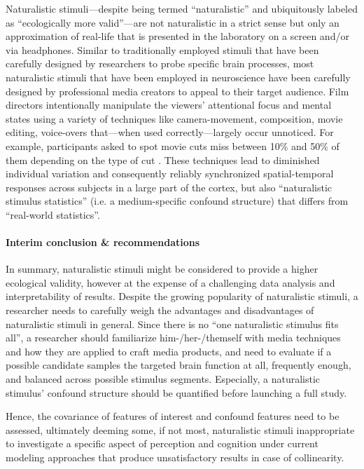 %
Naturalistic stimuli---despite being termed ``naturalistic'' and ubiquitously
labeled as ``ecologically more valid''---are not naturalistic in a strict sense
but only an approximation of real-life that is presented in the laboratory on a
screen and/or via headphones.
Similar to traditionally employed stimuli that have been carefully designed by
researchers to probe specific brain processes, most naturalistic stimuli that
have been employed in neuroscience have been carefully designed by professional
media creators to appeal to their target audience.
%
Film directors intentionally manipulate the viewers' attentional focus and
mental states using a variety of techniques like camera-movement, composition,
movie editing, voice-overs \citep{brown2012cinematography,
dancyger2011film-technique, katz1991film, mercado2011filmmakers} that---when
used correctly---largely occur unnoticed.
%
For example, participants asked to spot movie cuts miss between 10\% and 50\% of
them depending on the type of cut \citep{smith2008edit}.
%
These techniques lead to diminished individual variation and consequently
reliably synchronized spatial-temporal responses across subjects
\citep{hasson2008neurocinematics} in a large part of the cortex, but also
``naturalistic stimulus statistics'' (i.e. a medium-specific confound structure)
that differs from ``real-world statistics''.


\paragraph{Interim conclusion \& recommendations}

%
In summary, naturalistic stimuli might be considered to provide a higher
ecological validity, however at the expense of a challenging data analysis and
interpretability of results.
%
Despite the growing popularity of naturalistic stimuli, a researcher needs to
carefully weigh the advantages and disadvantages of naturalistic stimuli in
general.
%
Since there is no ``one naturalistic stimulus fits all'', a researcher should
familiarize him-/her-/themself  with media techniques and how they
are applied to craft media products, and need to evaluate if a possible
candidate samples the targeted brain function at all, frequently enough, and
balanced across possible stimulus segments.
%
Especially, a naturalistic stimulus' confound structure should be quantified
before launching a full study.

%
Hence, the covariance of features of interest and confound features need to be
assessed, ultimately deeming some, if not most, naturalistic stimuli
inappropriate to investigate a specific aspect of perception and cognition under
current modeling approaches that produce unsatisfactory results in case of
collinearity.

